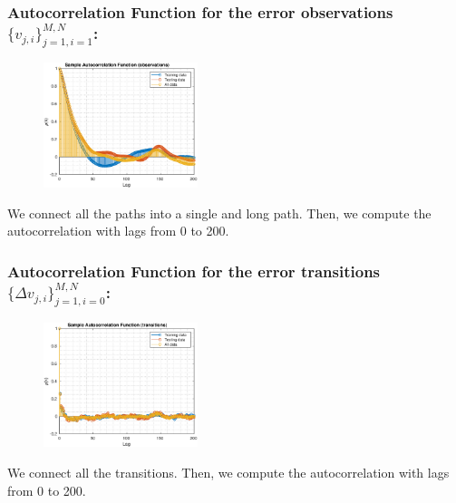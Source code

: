 \documentclass[aspectratio=169]{beamer}\usepackage[utf8]{inputenc}
\begin{document}
\begin{frame}\frametitle{Autocorrelation Function for the error observations $\{v_{j,i}\}_{j=1,i=1}^{M,N}$:}

\begin{figure}[ht!]
\centering
\includegraphics[width=0.4\textwidth]{../../MATLAB_Files/Results/Autocorrelation/observations.eps}
\end{figure}
We connect all the paths into a single and long path. Then, we compute the autocorrelation with lags from 0 to 200.

\end{frame}

\begin{frame}\frametitle{Autocorrelation Function for the error transitions $\{\Delta v_{j,i}\}_{j=1,i=0}^{M,N}$:}

\begin{figure}[ht!]
\centering
\includegraphics[width=0.4\textwidth]{../../MATLAB_Files/Results/Autocorrelation/transitions.eps}
\end{figure}
We connect all the transitions. Then, we compute the autocorrelation with lags from 0 to 200.


\end{frame}

\end{document}
